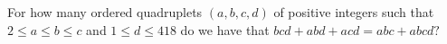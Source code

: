 For how many ordered quadruplets $(a,b,c,d)$ of positive integers such that $2\leq a\leq b \leq c$ and $1 \leq d \leq 418$ do we have that $bcd+abd+acd=abc+abcd?$